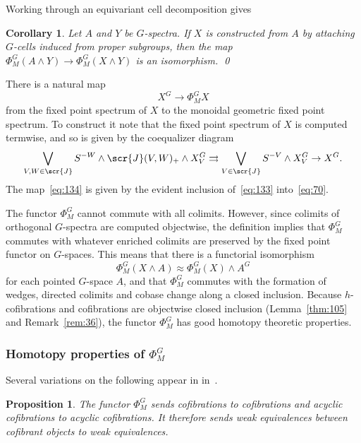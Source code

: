 \documentclass{amsart}
\newtheorem{cor}[equation]{Corollary}
\newtheorem{prop}[equation]{Proposition}
\theoremstyle{definition}
\theoremstyle{remark}
\newcommand{\gfpm}[1]{\Phi_{M}^{#1}}
\newcommand{\phigm}{\gfpm{G}}
\newcommand{\icat}{\scr{J}}
\begin{document}
Working through an equivariant cell decomposition gives

\begin{cor}
\label{thm:54} Let $A$ and $Y$ be $G$-spectra.  If $X$ is constructed
from $A$ by attaching $G$-cells induced from proper subgroups, then
the map $\phigm(A\wedge Y)\to \phigm(X\wedge Y)$ is an isomorphism.
\qed
\end{cor}

There is a natural map 
\begin{equation}
\label{eq:134}
X^{G}\to \phigm X
\end{equation}
from the fixed point spectrum of $X$ to the monoidal geometric fixed
point spectrum.   To construct it note that the fixed point spectrum
of $X$ is computed termwise, and so is given by the coequalizer
diagram 
\begin{equation}
\label{eq:133}
\bigvee_{V,W\in \icat} S^{-W}\wedge\icat(V,W)_{+}\wedge
X_{V}^{G}\rightrightarrows \bigvee_{V\in\icat } S^{-V}\wedge X_{V}^{G} \to
X^{G}.  
\end{equation}
The map~\eqref{eq:134} is given by the evident inclusion
of~\eqref{eq:133} into~\eqref{eq:70}.

The functor $\phigm$ cannot commute with all colimits.  However, since
colimits of orthogonal $G$-spectra are computed objectwise, the
definition implies that $\phigm$ commutes with whatever enriched
colimits are preserved by the fixed point functor on $G$-spaces.  This
means that there is a functorial isomorphism
\begin{equation}
\label{eq:76}
\phigm(X\wedge A) \approx \phigm(X)\wedge A^{G}
\end{equation}
for each pointed $G$-space $A$, and that $\phigm$ commutes with the
formation of wedges, directed colimits and cobase change along a
closed inclusion.  Because $h$-cofibrations and cofibrations are
objectwise closed inclusion (Lemma~\ref{thm:105} and
Remark~\ref{rem:36}), the functor $\phigm$ has good homotopy
theoretic properties.

\subsubsection{Homotopy properties of $\phigm$}
\label{sec:homot-prop-phig}

Several variations on the following appear in 
in~\cite[\S{}V.4]{MR1922205}.  

\begin{prop}
\label{thm:214}
The functor $\phigm$ sends cofibrations to cofibrations and acyclic
cofibrations to acyclic cofibrations.   It therefore sends weak
equivalences between cofibrant objects to weak equivalences.
\end{prop}
\end{document}
